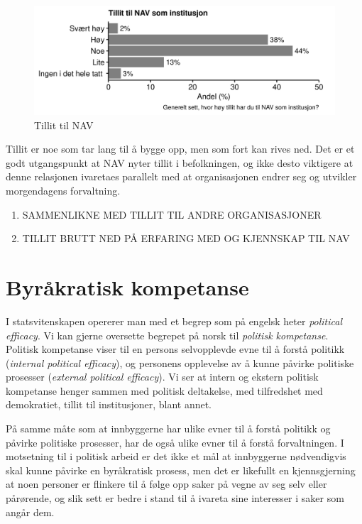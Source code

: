 \documentclass[
]{book}
\providecommand{\tightlist}{%
  \setlength{\itemsep}{0pt}\setlength{\parskip}{0pt}}
\begin{document}
\begin{figure}
\centering
\includegraphics{figs/png/fig_nav_trust.png}
\caption{Tillit til NAV}
\end{figure}

Tillit er noe som tar lang til å bygge opp, men som fort kan rives ned.
Det er et godt utgangspunkt at NAV nyter tillit i befolkningen, og ikke desto viktigere at denne relasjonen ivaretaes parallelt med at organisasjonen endrer seg og utvikler morgendagens forvaltning.

\begin{enumerate}
\def\labelenumi{\arabic{enumi}.}
\tightlist
\item
  SAMMENLIKNE MED TILLIT TIL ANDRE ORGANISASJONER
\item
  TILLIT BRUTT NED PÅ ERFARING MED OG KJENNSKAP TIL NAV
\end{enumerate}

\hypertarget{byruxe5kratisk-kompetanse}{%
\section{Byråkratisk kompetanse}\label{byruxe5kratisk-kompetanse}}

I statsvitenskapen opererer man med et begrep som på engelsk heter \emph{political efficacy}.
Vi kan gjerne oversette begrepet på norsk til \emph{politisk kompetanse}.
Politisk kompetanse viser til en persons selvopplevde evne til å forstå politikk (\emph{internal political efficacy}), og personens opplevelse av å kunne påvirke politiske prosesser (\emph{external political efficacy}).
Vi ser at intern og ekstern politisk kompetanse henger sammen med politisk deltakelse, med tilfredshet med demokratiet, tillit til institusjoner, blant annet.

På samme måte som at innbyggerne har ulike evner til å forstå politikk og påvirke politiske prosesser, har de også ulike evner til å forstå forvaltningen.
I motsetning til i politisk arbeid er det ikke et mål at innbyggerne nødvendigvis skal kunne påvirke en byråkratisk prosess, men det er likefullt en kjennsgjerning at noen personer er flinkere til å følge opp saker på vegne av seg selv eller pårørende, og slik sett er bedre i stand til å ivareta sine interesser i saker som angår dem.
\end{document}
